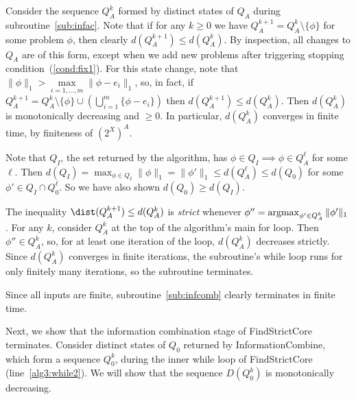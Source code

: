 \documentclass[11pt,reqno]{amsart}
\theoremstyle{definition}
\numberwithin{equation}{section}
\newcommand{\lft}{\left(}
\newcommand{\rt}{\right)}
\newcommand{\argmax}{\operatornamewithlimits{argmax}}
\newcommand{\pre}{\phi}
\newcommand{\prealloc}{(2^X)^A}
\newcommand{\acto}{Q_0}
\newcommand{\actok}{Q_0^k}
\newcommand{\acta}{Q_A}
\newcommand{\actak}{Q_A^k}
\newcommand{\actc}{Q_I}
\newcommand{\disto}{d}
\newcommand{\distt}{D}
\begin{document}
Consider the sequence $\actak$ formed by distinct states of $\acta$ during subroutine~\ref{sub:infac}.
Note that if for any $k\geq 0$ we have $\acta^{k+1} = \actak \setminus \{\pre\}$ for some problem $\pre$, then clearly $\disto(\acta^{k+1}) \leq \disto(\actak)$.
By inspection, all changes to $\acta$ are of this form, except when we add new problems after triggering stopping condition~(\ref{cond:fix1}).
For this state change, note that $\|\pre\|_1 > \max\limits_{i = 1,\hdots,m} \|\pre - e_i\|_1$, so, in fact, if $\acta^{k+1} = \actak \setminus \{\pre\} \cup \lft \bigcup_{i =1}^m \{\pre - e_i \} \rt$ then $\disto(\acta^{k+1}) \leq \disto(\actak)$. 
Then $\disto(\actak)$ is monotonically decreasing and $\geq 0$.
In particular, $\disto(\actak)$ converges in finite time, by finiteness of $\prealloc$.

Note that $\actc$, the set returned by the algorithm, has $\pre \in \actc \implies \pre \in \acta^{\ell}$ for some $\ell$.
Then $\disto(\actc) = \max_{\pre\in\actc} \|\pre\|_1 = \|\pre'\|_1 \leq \disto(\acta^{\ell}) \leq \disto(\acto)$ for some $\pre' \in \actc \cap \acto^{\ell}$.
So we have also shown $\disto(\acto) \geq \disto(\actc)$.

The inequality $\dist(\acta^{k+1}) \leq \disto(\actak)$ is \emph{strict} whenever $\pre'' = \argmax_{\pre' \in \actak} \|\pre'\|_1$. 
For any $k$, consider $\actak$ at the top of the algorithm's main for loop. 
Then $\pre'' \in \actak$, so, for at least one iteration of the loop, $\disto(\actak)$ decreases strictly.
Since $\disto(\actak)$ converges in finite iterations, the subroutine's while loop runs for only finitely many iterations, so the subroutine terminates.

Since all inputs are finite, subroutine~\ref{sub:infcomb} clearly terminates in finite time.

Next, we show that the information combination stage of FindStrictCore terminates.
Consider distinct states of $\acto$ returned by InformationCombine, which form a sequence $\actok$, during the inner while loop of FindStrictCore (line~\ref{alg3:while2}).
We will show that the sequence $\distt(\actok)$ is monotonically decreasing.
\end{document}
